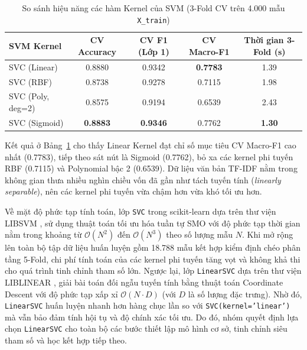 \begin{table}[H]
\centering
\begin{tabular}{|l|c|c|c|c|}
\hline
\textbf{SVM Kernel} & \textbf{CV Accuracy} & \textbf{CV F1 (Lớp 1)} & \textbf{CV Macro-F1} & \textbf{Thời gian 3-Fold (s)} \\ \hline
SVC (Linear) & 0.8880 & 0.9342 & \textbf{0.7783} & 1.39 \\ \hline
SVC (RBF) & 0.8738 & 0.9278 & 0.7115 & 1.98 \\ \hline
SVC (Poly, deg=2) & 0.8575 & 0.9194 & 0.6539 & 2.43 \\ \hline
SVC (Sigmoid) & \textbf{0.8883} & \textbf{0.9346} & 0.7762 & \textbf{1.30} \\ \hline
\end{tabular}
\caption{So sánh hiệu năng các hàm Kernel của SVM (3-Fold CV trên 4.000 mẫu \texttt{X\_train})}
\label{tab:kernel_eval}
\end{table}

Kết quả ở Bảng~\ref{tab:kernel_eval} cho thấy Linear Kernel đạt chỉ số mục tiêu CV Macro-F1 cao nhất (0.7783), tiếp theo sát nút là Sigmoid (0.7762), bỏ xa các kernel phi tuyến RBF (0.7115) và Polynomial bậc 2 (0.6539). Dữ liệu văn bản TF-IDF nằm trong không gian thưa nhiều nghìn chiều vốn đã gần như tách tuyến tính (\textit{linearly separable}), nên các kernel phi tuyến vừa chậm hơn vừa khó tối ưu hơn.

Về mặt độ phức tạp tính toán, lớp \texttt{SVC} trong scikit-learn dựa trên thư viện LIBSVM \cite{chang2011}, sử dụng thuật toán tối ưu hóa tuần tự SMO với độ phức tạp thời gian nằm trong khoảng từ $\mathcal{O}(N^2)$ đến $\mathcal{O}(N^3)$ theo số lượng mẫu $N$. Khi mở rộng lên toàn bộ tập dữ liệu huấn luyện gồm 18.788 mẫu kết hợp kiểm định chéo phân tầng 5-Fold, chi phí tính toán của các kernel phi tuyến tăng vọt và không khả thi cho quá trình tinh chỉnh tham số lớn. Ngược lại, lớp \texttt{LinearSVC} dựa trên thư viện LIBLINEAR \cite{fan2008}, giải bài toán đối ngẫu tuyến tính bằng thuật toán Coordinate Descent với độ phức tạp xấp xỉ $\mathcal{O}(N \cdot D)$ (với $D$ là số lượng đặc trưng). Nhờ đó, \texttt{LinearSVC} huấn luyện nhanh hơn hàng chục lần so với \texttt{SVC(kernel='linear')} mà vẫn bảo đảm tính hội tụ và độ chính xác tối ưu. Do đó, nhóm quyết định lựa chọn \texttt{LinearSVC} cho toàn bộ các bước thiết lập mô hình cơ sở, tinh chỉnh siêu tham số và học kết hợp tiếp theo.

